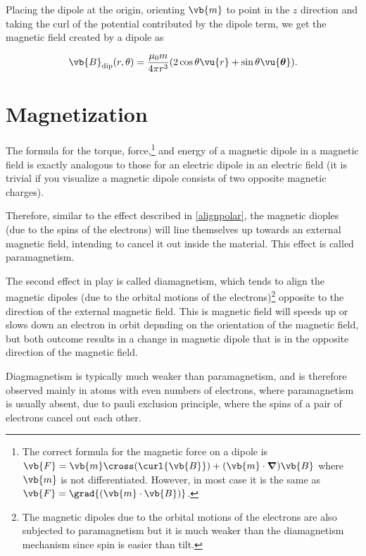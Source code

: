 \documentclass[english,a4paper,12pt]{report}
\begin{document}
Placing the dipole at the origin, orienting \(\vb{m} \) to point in the \(z\) direction and taking the curl of the potential contributed by the dipole term, we get the magnetic field created by a dipole as

\begin{equation}
    \vb{B} _{\text{dip} } (r, \theta ) = \frac{\mu_0 m}{4\pi r^3 }(2\cos \theta \vu{r} + \sin \theta \vu{\boldsymbol{\theta } }). 
\end{equation}

\section{Magnetization}



The formula for the torque, force,\footnote{The correct formula for the magnetic force on a dipole is \(\vb{F} = \vb{m} \cross (\curl{\vb{B} } ) + (\vb{m} \cdot \boldsymbol{\nabla } )\vb{B} \) where \(\vb{m} \) is not differentiated. However, in most case it is the same as \(\vb{F} = \grad{(\vb{m} \cdot \vb{B} )}\).}  and energy of a magnetic dipole in a magnetic field is exactly analogous to those for an electric dipole in an electric field (it is trivial if you visualize a magnetic dipole consists of two opposite magnetic charges).

Therefore, similar to the effect described in \cref{alignpolar}, the magnetic dioples (due to the spins of the electrons) will line themselves up towards an external magnetic field, intending to cancel it out inside the material. This effect is called paramagnetism. 

The second effect in play is called diamagnetism, which tends to align the magnetic dipoles (due to the orbital motions of the electrons)\footnote{The magnetic dipoles due to the orbital motions of the electrons are also subjected to paramagnetism but it is much weaker than the diamagnetism mechanism since spin is easier than tilt.}  opposite to the direction of the external magnetic field. This is magnetic field will speeds up or slows down an electron in orbit depnding on the orientation of the magnetic field, but both outcome results in a change in magnetic dipole that is in the opposite direction of the magnetic field. 

Diagmagnetism is typically much weaker than paramagnetism, and is therefore observed mainly in atoms with even numbers of electrons, where paramagnetism is usually absent, due to pauli exclusion principle, where the spins of a pair of electrons cancel out each other. 
\end{document}
